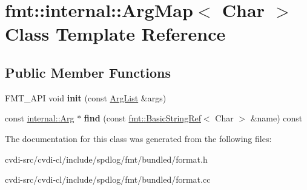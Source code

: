 \hypertarget{classfmt_1_1internal_1_1ArgMap}{}\section{fmt\+:\+:internal\+:\+:Arg\+Map$<$ Char $>$ Class Template Reference}
\label{classfmt_1_1internal_1_1ArgMap}
\subsection*{Public Member Functions}
\begin{DoxyCompactItemize}
\item 
F\+M\+T\+\_\+\+A\+PI void {\bfseries init} (const \hyperlink{classfmt_1_1ArgList}{Arg\+List} \&args)\hypertarget{classfmt_1_1internal_1_1ArgMap_aba1e77b1b5358a8e354acae3d71ea6cf}{}\label{classfmt_1_1internal_1_1ArgMap_aba1e77b1b5358a8e354acae3d71ea6cf}

\item 
const \hyperlink{structfmt_1_1internal_1_1Arg}{internal\+::\+Arg} $\ast$ {\bfseries find} (const \hyperlink{classfmt_1_1BasicStringRef}{fmt\+::\+Basic\+String\+Ref}$<$ Char $>$ \&name) const \hypertarget{classfmt_1_1internal_1_1ArgMap_a588b3169b52f72f8958a53a5f440a401}{}\label{classfmt_1_1internal_1_1ArgMap_a588b3169b52f72f8958a53a5f440a401}

\end{DoxyCompactItemize}


The documentation for this class was generated from the following files\+:\begin{DoxyCompactItemize}
\item 
cvdi-\/src/cvdi-\/cl/include/spdlog/fmt/bundled/format.\+h\item 
cvdi-\/src/cvdi-\/cl/include/spdlog/fmt/bundled/format.\+cc\end{DoxyCompactItemize}
